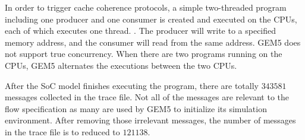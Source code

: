 \documentclass[conference]{IEEEtran}
\begin{document}

In order to trigger cache coherence protocols, a simple two-threaded program including one producer and one consumer is created and executed on the CPUs, each of which executes one thread.   . The producer will write to a specified memory address, and the consumer will read from the same address. GEM5 does not support true concurrency.  When there are two programs running on the CPUs, GEM5 alternates the executions between the two  CPUs.  


After the SoC model finishes executing the program, there are totally $343581$ messages collected in the trace file.  Not all of the messages are relevant to the flow specification as many are used by GEM5 to initialize its simulation environment.  After removing those irrelevant messages, the number of messages in the trace file is to reduced to $121138$. 
\end{document}
